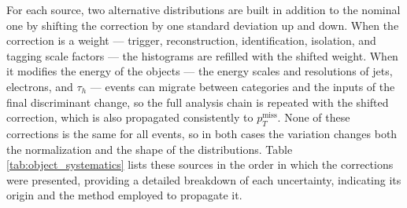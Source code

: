 For each source, two alternative distributions are built in addition to the nominal one by shifting the correction by one standard deviation up and down. When the correction is a weight — trigger, reconstruction, identification, isolation, and tagging scale factors — the histograms are refilled with the shifted weight. When it modifies the energy of the objects — the energy scales and resolutions of jets, electrons, and $\tau_h$ — events can migrate between categories and the inputs of the final discriminant change, so the full analysis chain is repeated with the shifted correction, which is also propagated consistently to $p_T^\text{miss}$. None of these corrections is the same for all events, so in both cases the variation changes both the normalization and the shape of the distributions. Table \ref{tab:object_systematics} lists these sources in the order in which the corrections were presented, providing a detailed breakdown of each uncertainty, indicating its origin and the method employed to propagate it.
